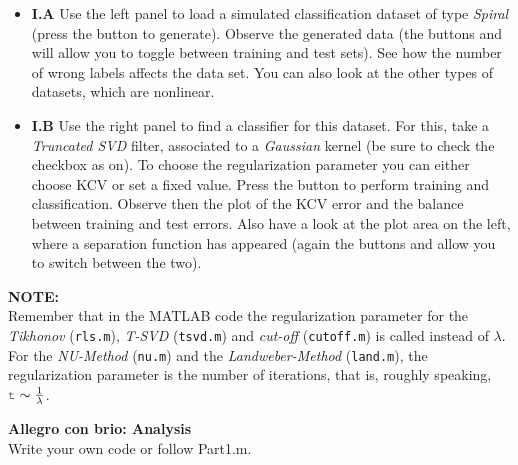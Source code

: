 \documentclass[DIN, pagenumber=false, fontsize=11pt, parskip=half]{scrartcl}
\newcommand{\mysection}[1]{\noindent\large\textbf{#1}}
\begin{document}
\begin{itemize}
	\item \textbf{I.A} Use the left panel to load  a simulated classification dataset of type \textit{Spiral} (press the button  to generate).
	Observe the generated data (the buttons  and  will allow you to toggle between training and test sets).
	See how the number of wrong labels affects the data set.
	You can also look at the other types of datasets, which are nonlinear.
	\item \textbf{I.B} 
	Use the right panel to find a  classifier for this dataset.
	For this, take a \textit{Truncated SVD} filter, associated to a \textit{Gaussian} kernel (be sure to check the  checkbox as on).
	To choose the regularization parameter you can either choose KCV or set a fixed value.
	Press the button  to perform training and classification.
	Observe then the plot of the KCV error and the balance between training and test errors.
	Also have a look at the plot area on the left, where a separation function has appeared (again the buttons  and  allow you to switch between the two).
\end{itemize}

\begin{framed}
\textbf{NOTE:} \\
Remember that in the MATLAB code the regularization parameter for the \emph{Tikhonov} (\texttt{rls.m}), \emph{T-SVD} (\texttt{tsvd.m}) and \emph{cut-off} (\texttt{cutoff.m}) is called  instead of $\lambda$. For the \emph{NU-Method} (\texttt{nu.m}) and the \emph{Landweber-Method} (\texttt{land.m}), the regularization parameter  is the number of iterations, that is, roughly speaking, $\mcode{t} \sim \frac{1}{\lambda}$.
\end{framed}




\mysection{Allegro con brio: Analysis}\\
Write your own code or follow Part1.m.
\end{document}
